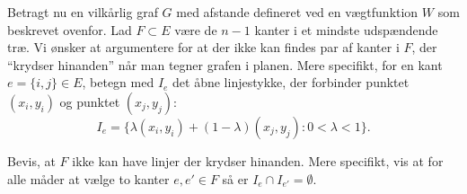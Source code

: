 Betragt nu en vilkårlig graf $G$ med afstande defineret ved en vægtfunktion $W$ som beskrevet ovenfor.
Lad $F \subset E$ være de $n-1$ kanter i et mindste udspændende træ. Vi ønsker at argumentere for at der ikke kan findes par af kanter i $F$, der ``krydser hinanden'' når man tegner grafen i planen.
Mere specifikt, for en kant $e = \{i,j\} \in E$, betegn med $I_e$ det åbne linjestykke, der forbinder punktet $(x_i,y_i)$ og punktet $(x_j,y_j)$:
$$I_e = \{ \lambda (x_i,y_i)+(1-\lambda) (x_j,y_j) : 0 < \lambda < 1\}.$$

{Bevis, at $F$ ikke kan have linjer der krydser hinanden. Mere specifikt, vis at for alle måder at vælge to kanter $e,e' \in F$ så er $I_e \cap I_{e'} = \emptyset$.}






\label{page:last}
